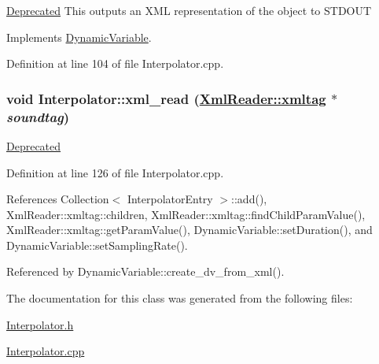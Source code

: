\begin{Desc}
\item[\hyperlink{deprecated__deprecated000016}{Deprecated}]This outputs an XML representation of the object to STDOUT \end{Desc}


Implements \hyperlink{classDynamicVariable_a11}{Dynamic\-Variable}.

Definition at line 104 of file Interpolator.cpp.\hypertarget{classInterpolator_a9}{
\subsubsection[xml\_\-read]{\setlength{\rightskip}{0pt plus 5cm}void Interpolator::xml\_\-read (\hyperlink{classXmlReader_1_1xmltag}{Xml\-Reader::xmltag} $\ast$ {\em soundtag})}}
\label{classInterpolator_a9}


\begin{Desc}
\item[\hyperlink{deprecated__deprecated000018}{Deprecated}]\end{Desc}


Definition at line 126 of file Interpolator.cpp.

References Collection$<$ Interpolator\-Entry $>$::add(), Xml\-Reader::xmltag::children, Xml\-Reader::xmltag::find\-Child\-Param\-Value(), Xml\-Reader::xmltag::get\-Param\-Value(), Dynamic\-Variable::set\-Duration(), and Dynamic\-Variable::set\-Sampling\-Rate().

Referenced by Dynamic\-Variable::create\_\-dv\_\-from\_\-xml().

The documentation for this class was generated from the following files:\begin{CompactItemize}
\item 
\hyperlink{Interpolator_8h}{Interpolator.h}\item 
\hyperlink{Interpolator_8cpp}{Interpolator.cpp}\end{CompactItemize}
